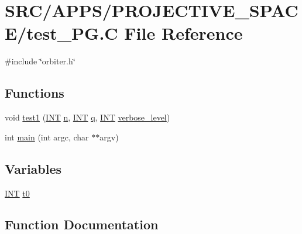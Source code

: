 \hypertarget{test___p_g_8_c}{}\section{S\+R\+C/\+A\+P\+P\+S/\+P\+R\+O\+J\+E\+C\+T\+I\+V\+E\+\_\+\+S\+P\+A\+C\+E/test\+\_\+\+PG.C File Reference}
\label{test___p_g_8_c}
{\ttfamily \#include \char`\"{}orbiter.\+h\char`\"{}}\newline
\subsection*{Functions}
\begin{DoxyCompactItemize}
\item 
void \mbox{\hyperlink{test___p_g_8_c_ae2a201e46836d85cb2c5579a837b641a}{test1}} (\mbox{\hyperlink{galois_8h_a09fddde158a3a20bd2dcadb609de11dc}{I\+NT}} \mbox{\hyperlink{simeon_8_c_a7f2cd26777ce0ff3fdaf8d02aacbddfb}{n}}, \mbox{\hyperlink{galois_8h_a09fddde158a3a20bd2dcadb609de11dc}{I\+NT}} \mbox{\hyperlink{simeon_8_c_a92cbb483a3b27ae1a0dbfcb125ce216f}{q}}, \mbox{\hyperlink{galois_8h_a09fddde158a3a20bd2dcadb609de11dc}{I\+NT}} \mbox{\hyperlink{simeon_8_c_a818073fbcc2f439e7c56952f67386122}{verbose\+\_\+level}})
\item 
int \mbox{\hyperlink{test___p_g_8_c_a3c04138a5bfe5d72780bb7e82a18e627}{main}} (int argc, char $\ast$$\ast$argv)
\end{DoxyCompactItemize}
\subsection*{Variables}
\begin{DoxyCompactItemize}
\item 
\mbox{\hyperlink{galois_8h_a09fddde158a3a20bd2dcadb609de11dc}{I\+NT}} \mbox{\hyperlink{test___p_g_8_c_a4268f4fe222ffb119218a0199f5e1904}{t0}}
\end{DoxyCompactItemize}


\subsection{Function Documentation}
\mbox{\label{test___p_g_8_c_a3c04138a5bfe5d72780bb7e82a18e627}} 
